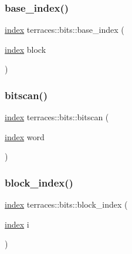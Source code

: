 \subsubsection{\texorpdfstring{base\+\_\+index()}{base\_index()}}
{\footnotesize\ttfamily \hyperlink{namespaceterraces_adbc33ccb543d1634e96d0eb02e472c77}{index} terraces\+::bits\+::base\+\_\+index (\begin{DoxyParamCaption}\item[{\hyperlink{namespaceterraces_adbc33ccb543d1634e96d0eb02e472c77}{index}}]{block }\end{DoxyParamCaption})\hspace{0.3cm}{\ttfamily [inline]}}

\mbox{\label{namespaceterraces_1_1bits_ac5218845131589e0357e909d9fd41a12}} 
\subsubsection{\texorpdfstring{bitscan()}{bitscan()}}
{\footnotesize\ttfamily \hyperlink{namespaceterraces_adbc33ccb543d1634e96d0eb02e472c77}{index} terraces\+::bits\+::bitscan (\begin{DoxyParamCaption}\item[{\hyperlink{namespaceterraces_adbc33ccb543d1634e96d0eb02e472c77}{index}}]{word }\end{DoxyParamCaption})\hspace{0.3cm}{\ttfamily [inline]}}

\mbox{\label{namespaceterraces_1_1bits_abeaebe2ada42cd4172c5e6d751168e91}} 
\subsubsection{\texorpdfstring{block\+\_\+index()}{block\_index()}}
{\footnotesize\ttfamily \hyperlink{namespaceterraces_adbc33ccb543d1634e96d0eb02e472c77}{index} terraces\+::bits\+::block\+\_\+index (\begin{DoxyParamCaption}\item[{\hyperlink{namespaceterraces_adbc33ccb543d1634e96d0eb02e472c77}{index}}]{i }\end{DoxyParamCaption})\hspace{0.3cm}{\ttfamily [inline]}}

